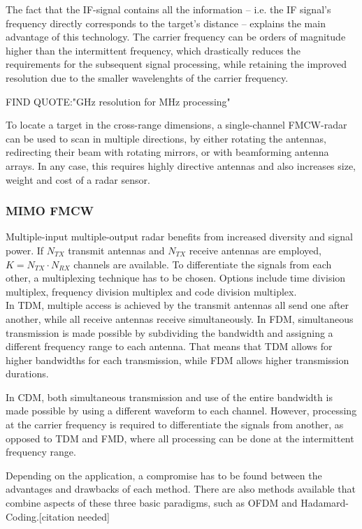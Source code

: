 The fact that the IF-signal contains all the information
-- i.e. the IF signal's frequency directly corresponds to the target's distance --
explains the main advantage of this technology.
The carrier frequency can be orders of magnitude higher than the intermittent frequency,
which drastically reduces the requirements for the subsequent signal processing,
while retaining the improved resolution due to the smaller wavelenghts of the carrier frequency.

FIND QUOTE:"GHz resolution for MHz processing"

To locate a target in the cross-range dimensions,
a single-channel FMCW-radar can be used to scan in multiple directions,
by either rotating the antennas, redirecting their beam with rotating mirrors, or with beamforming antenna arrays.
In any case, this requires highly directive antennas and also increases size, weight and cost of a radar sensor.

\subsubsection*{MIMO FMCW}
Multiple-input multiple-output radar benefits from increased diversity and signal power.
If $N_{TX}$ transmit antennas and $N_{TX}$ receive antennas are employed, $K=N_{TX} \cdot N_{RX}$ channels are available.
To differentiate the signals from each other, a multiplexing technique has to be chosen.
Options include time division multiplex, frequency division multiplex and code division multiplex. \\

In TDM, multiple access is achieved by the transmit antennas all send one after another,
while all receive antennas receive simultaneously.
In FDM, simultaneous transmission is made possible by subdividing the bandwidth and assigning a different frequency range to each antenna.
That means that TDM allows for higher bandwidths for each transmission, while FDM allows higher transmission durations.

In CDM, both simultaneous transmission and use of the entire bandwidth is made possible by using a different waveform to each channel.
However, processing at the carrier frequency is required to differentiate the signals from another, as opposed to TDM and FMD,
where all processing can be done at the intermittent frequency range.

Depending on the application, a compromise has to be found between the advantages and drawbacks of each method.
There are also methods available that combine aspects of these three basic paradigms, such as OFDM and Hadamard-Coding.[citation needed] \\

